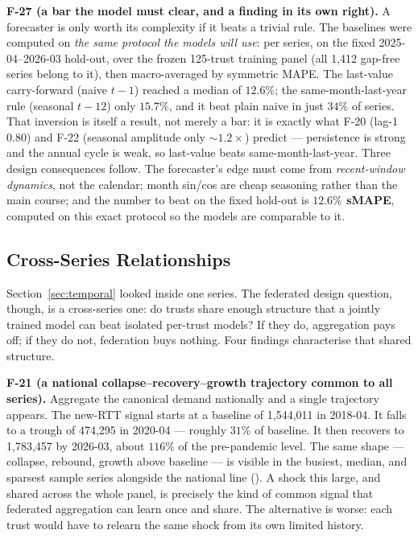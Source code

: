\documentclass[11pt,a4paper]{article}
\begin{document}
\textbf{F-27 (a bar the model must clear, and a finding in its own right).} A forecaster is only worth its complexity if it beats a trivial rule. The baselines were computed on \emph{the same protocol the models will use}: per series, on the fixed 2025-04--2026-03 hold-out, over the frozen 125-trust training panel (all 1{,}412 gap-free series belong to it), then macro-averaged by symmetric MAPE. The last-value carry-forward (naive $t-1$) reached a median of $12.6\%$; the same-month-last-year rule (seasonal $t-12$) only $15.7\%$, and it beat plain naive in just $34\%$ of series. That inversion is itself a result, not merely a bar: it is exactly what F-20 (lag-1 $0.80$) and F-22 (seasonal amplitude only $\sim$$1.2\times$) predict --- persistence is strong and the annual cycle is weak, so last-value beats same-month-last-year. Three design consequences follow. The forecaster's edge must come from \emph{recent-window dynamics}, not the calendar; month sin/cos are cheap seasoning rather than the main course; and the number to beat on the fixed hold-out is \textbf{$12.6\%$ sMAPE}, computed on this exact protocol so the models are comparable to it.

\subsection{Cross-Series Relationships}\label{sec:rel}

Section~\ref{sec:temporal} looked inside one series. The federated design question, though, is a cross-series one: do trusts share enough structure that a jointly trained model can beat isolated per-trust models? If they do, aggregation pays off; if they do not, federation buys nothing. Four findings characterise that shared structure.

\textbf{F-21 (a national collapse--recovery--growth trajectory common to all series).} Aggregate the canonical demand nationally and a single trajectory appears. The new-RTT signal starts at a baseline of 1{,}544{,}011 in 2018-04. It falls to a trough of 474{,}295 in 2020-04 --- roughly $31\%$ of baseline. It then recovers to 1{,}783{,}457 by 2026-03, about $116\%$ of the pre-pandemic level. The same shape --- collapse, rebound, growth above baseline --- is visible in the busiest, median, and sparsest sample series alongside the national line (). A shock this large, and shared across the whole panel, is precisely the kind of common signal that federated aggregation can learn once and share. The alternative is worse: each trust would have to relearn the same shock from its own limited history.
\end{document}
